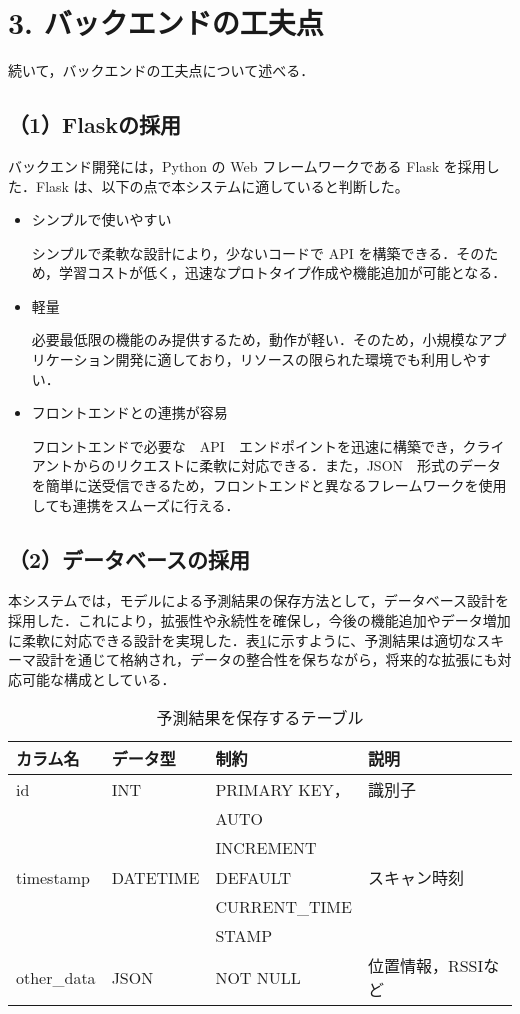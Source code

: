 \section*{3. バックエンドの工夫点}

続いて，バックエンドの工夫点について述べる．

\subsection*{（1）Flaskの採用}
バックエンド開発には，Python の Web フレームワークである Flask を採用した．Flask は、以下の点で本システムに適していると判断した。

\begin{itemize}
	\item シンプルで使いやすい
	
	シンプルで柔軟な設計により，少ないコードで API を構築できる．そのため，学習コストが低く，迅速なプロトタイプ作成や機能追加が可能となる．
	
	\item 軽量
	
	必要最低限の機能のみ提供するため，動作が軽い．そのため，小規模なアプリケーション開発に適しており，リソースの限られた環境でも利用しやすい．

	\item フロントエンドとの連携が容易
	 
	フロントエンドで必要な　API　エンドポイントを迅速に構築でき，クライアントからのリクエストに柔軟に対応できる．また，JSON　形式のデータを簡単に送受信できるため，フロントエンドと異なるフレームワークを使用しても連携をスムーズに行える．
\end{itemize}

\subsection*{（2）データベースの採用}
本システムでは，モデルによる予測結果の保存方法として，データベース設計を採用した．これにより，拡張性や永続性を確保し，今後の機能追加やデータ増加に柔軟に対応できる設計を実現した．表\ref{tbl:prediction_table}に示すように、予測結果は適切なスキーマ設計を通じて格納され，データの整合性を保ちながら，将来的な拡張にも対応可能な構成としている．

\begin{table}[tb]
	\centering
	\caption{予測結果を保存するテーブル}
	\label{tbl:prediction_table}
	\small
	\doublerulesep=0.3pt
	\begin{tabular}{l|l|l|l} \hline\hline\hline
		カラム名 & データ型 & 制約 & 説明 \\ \hline
		id & INT & PRIMARY KEY， &  識別子 \\
		&&AUTO& \\
		&&INCREMENT& \\ \hline
		timestamp & DATETIME & DEFAULT  & スキャン時刻 \\
		&&CURRENT\_TIME& \\
		&&STAMP& \\ \hline
		other\_data & JSON & NOT NULL & 位置情報，RSSIなど \\  \hline\hline\hline
	\end{tabular}
\end{table}

